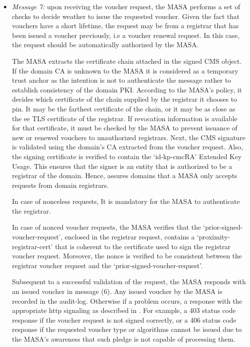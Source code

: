 \begin{itemize}
	\item \textit{Message 7:} upon receiving the voucher request, the MASA performs a set of checks to decide weather to issue the requested voucher. Given the fact that vouchers have a short lifetime, the request may be from a registrar that has been issued a voucher previously, i.e a voucher renewal request. In this case, the request should be automatically authorized by the MASA.
	\par
	 The MASA extracts the certificate chain attached in the signed CMS object. If the domain CA is unknown to the MASA it is considered as a temporary trust anchor as the intention is not to authenticate the message rather to establish consistency of the domain PKI. According to the MASA's policy, it decides which certificate of the chain supplied by the registrar it chooses to pin. It may be the farthest certificate of the chain, or it may be as close as the \gls{ee} TLS certificate of the registrar. If revocation information is available for that certificate, it must be checked by the MASA to prevent issuance of new or renewed vouchers to unauthorized registrars. Next, the CMS signature is validated using the domain's CA extracted from the voucher request. Also, the signing certificate is verified to contain the `id-kp-cmcRA' Extended Key Usage. This ensures that the signer is an entity that is authorized to be a registrar of the domain. Hence, assures domains that a MASA only accepts requests from domain registrars. 
	 \par
	 In case of nonceless requests, It is mandatory for the MASA to authenticate the registrar.
	 \par 
	 In case of nonced voucher requests, the MASA verifies that the `prior-signed-voucher-request', enclosed in the registrar request, contains a `proximity-registrar-cert' that is coherent to the certificate used to sign the registrar voucher request. Moreover, the nonce is verified to be consistent between the registrar voucher request and the `prior-signed-voucher-request'.
	 \par
	 Subsequent to a successful validation of the request, the MASA responds with an issued voucher in message (6). Any issued voucher by the MASA is recorded in the audit-log. Otherwise if a problem occurs, a response with the appropriate http signaling as described in \cite{brski}. For example, a 403 status code response if the voucher request is not signed correctly, or a 406 status code response if the requested voucher type or algorithms cannot be issued due to the MASA's awareness that such pledge is not capable of processing them.
	 

\end{itemize}
